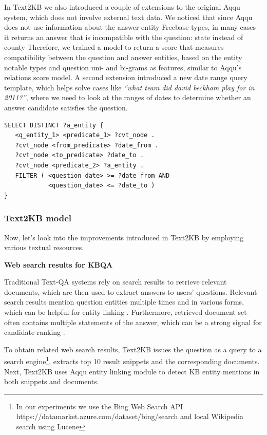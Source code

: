 In Text2KB we also introduced a couple of extensions to the original Aqqu system, which does not involve external text data.
We noticed that since Aqqu does not use information about the answer entity Freebase types, in many cases it returns an answer that is incompatible with the question: \eg state instead of county \etc
Therefore, we trained a model to return a score that measures compatibility between the question and answer entities, based on the entity notable types and question uni- and bi-grams as features, similar to Aqqu's relations score model.
A second extension introduced a new date range query template, which helps solve cases like \textit{``what team did david beckham play for in 2011?''}, where we need to look at the ranges of dates to determine whether an answer candidate satisfies the question.

\begin{minipage}{16cm}
\begin{lstlisting}[frame=single,basicstyle=\small]
SELECT DISTINCT ?a_entity {
   <q_entity_1> <predicate_1> ?cvt_node .
   ?cvt_node <from_predicate> ?date_from .
   ?cvt_node <to_predicate> ?date_to .
   ?cvt_node <predicate_2> ?a_entity .
   FILTER ( <question_date> >= ?date_from AND
            <question_date> <= ?date_to )
}
\end{lstlisting}
\end{minipage}


\subsubsection{Text2KB model}
\label{section:factoid:approaches:text2kb:model}

Now, let's look into the improvements introduced in Text2KB by employing various textual resources.

\textbf{Web search results for KBQA}

Traditional Text-QA systems rely on search results to retrieve relevant documents, which are then used to extract answers to users' questions.
Relevant search results mention question entities multiple times and in various forms, which can be helpful for entity linking \cite{SMAPH_ERD:2014}.
Furthermore, retrieved document set often contains multiple statements of the answer, which can be a strong signal for candidate ranking \cite{lin2007exploration}.

To obtain related web search results, Text2KB issues the question as a query to a search engine\footnote{In our experiments we use the Bing Web Search API https://datamarket.azure.com/dataset/bing/search and local Wikipedia search using Lucene}, extracts top 10 result snippets and the corresponding documents.
Next, Text2KB uses Aqqu entity linking module to detect KB entity mentions in both snippets and documents.

